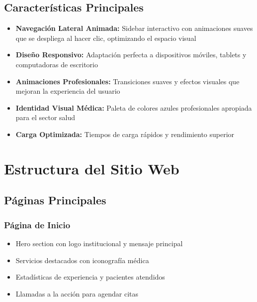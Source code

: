\documentclass[12pt,a4paper]{article}
\begin{document}
\subsection{Características Principales}

\begin{itemize}[leftmargin=*]
    \item \textbf{Navegación Lateral Animada:} Sidebar interactivo con animaciones suaves que se despliega al hacer clic, optimizando el espacio visual
    \item \textbf{Diseño Responsivo:} Adaptación perfecta a dispositivos móviles, tablets y computadoras de escritorio
    \item \textbf{Animaciones Profesionales:} Transiciones suaves y efectos visuales que mejoran la experiencia del usuario
    \item \textbf{Identidad Visual Médica:} Paleta de colores azules profesionales apropiada para el sector salud
    \item \textbf{Carga Optimizada:} Tiempos de carga rápidos y rendimiento superior
\end{itemize}

\section{Estructura del Sitio Web}

\subsection{Páginas Principales}

\subsubsection{Página de Inicio}
\begin{itemize}
    \item Hero section con logo institucional y mensaje principal
    \item Servicios destacados con iconografía médica
    \item Estadísticas de experiencia y pacientes atendidos
    \item Llamadas a la acción para agendar citas
\end{itemize}
\end{document}
